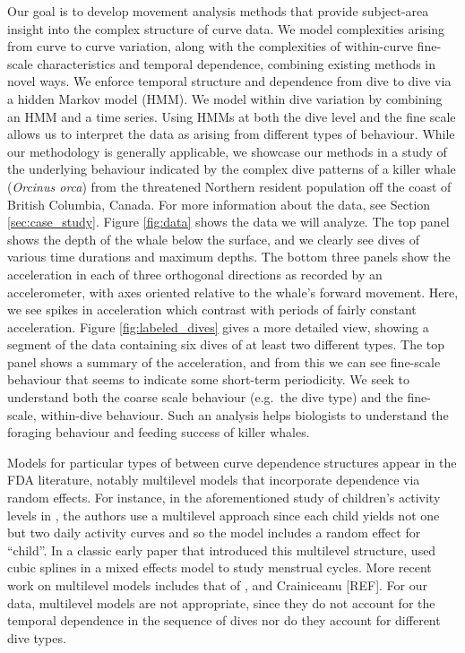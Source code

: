 Our goal is to develop movement analysis methods that provide subject-area insight  into the complex structure of curve data.
We  model complexities arising  from curve to curve variation, along with the complexities of within-curve fine-scale characteristics and temporal dependence,
combining existing methods in novel ways.
We enforce temporal structure and dependence from dive to dive via a hidden Markov model (HMM).
We model within dive variation by combining an HMM and a time series.
Using HMMs at both the dive level and the fine scale allows us to interpret the data as arising from different types of behaviour.
While our methodology is generally applicable, we  showcase our methods in a  study of the underlying behaviour indicated by the complex dive patterns of a killer whale (\textit{Orcinus orca}) from the threatened Northern resident population off the coast of British Columbia, Canada.  
For more information about the data, see Section \ref{sec:case_study}.
Figure \ref{fig:data} shows the data we will analyze.
The top panel shows the depth of the whale below the surface, and we clearly see dives of various time durations and maximum depths. 
The bottom three panels show the acceleration in each of three orthogonal directions as recorded by an accelerometer,   
with axes oriented relative to the whale's forward movement.
Here, we see spikes in acceleration which contrast with periods of fairly constant acceleration.
Figure {\ref{fig:labeled_dives}} gives a more detailed view, showing a segment of the data containing six dives of at least two different types.
The top panel  shows a summary  of the acceleration, and from this we can see fine-scale behaviour  that seems to indicate some  short-term periodicity. 
We seek to understand both the coarse scale behaviour (e.g.~the dive type) and the fine-scale, within-dive behaviour. 
Such an analysis helps biologists to understand the foraging behaviour and feeding success of killer whales. 

Models for particular types of between curve dependence structures appear in the FDA literature, 
notably multilevel models that incorporate dependence via random effects.
For instance, in the aforementioned study of children's activity levels in  \cite{Morris:2007}, the authors use a multilevel approach since each child yields not one but two daily activity curves and so the model includes a random effect for ``child''.
In a classic early paper that introduced this multilevel structure,  \cite{Bromback:1998} used cubic splines in a mixed effects model to study menstrual cycles.  More recent work on multilevel models includes that of \cite{di:2009}, \cite{chen:2012} and Crainiceanu [REF]. 
For our data, multilevel models are not appropriate, since they do not account for the temporal dependence in the sequence of dives nor do they account for different dive types.

